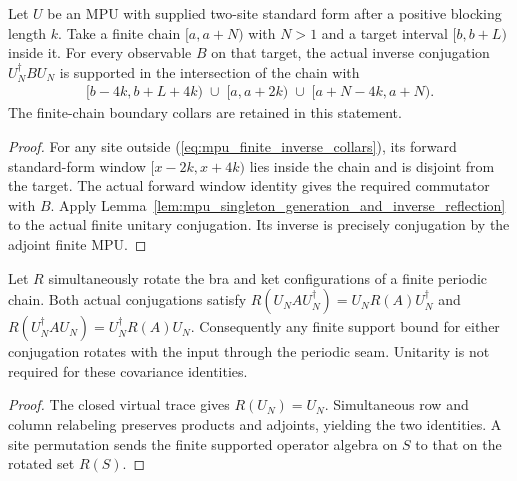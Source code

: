 \begin{lemma}
    \label{lem:mpu_finite_inverse_buffered_region}
    \leanok
    Let $U$ be an MPU with supplied two-site standard form after a
    positive blocking length $k$. Take a finite chain $[a,a+N)$ with
    $N>1$ and a target interval $[b,b+L)$ inside it. For every observable
    $B$ on that target, the actual inverse conjugation $U_N^\dagger B U_N$
    is supported in the intersection of the chain with
    \begin{align}
        \lbrack b-4k,b+L+4k)\;\cup\;\lbrack a,a+2k)\;\cup\;\lbrack a+N-4k,a+N).
        \label{eq:mpu_finite_inverse_collars}
    \end{align}
    The finite-chain boundary collars are retained in this statement.
\end{lemma}
\begin{proof}\leanok
    For any site outside (\ref{eq:mpu_finite_inverse_collars}), its
    forward standard-form window $[x-2k,x+4k)$ lies inside the chain
    and is disjoint from the target. The actual forward window identity
    gives the required commutator with $B$. Apply
    Lemma~\ref{lem:mpu_singleton_generation_and_inverse_reflection} to the actual
    finite unitary conjugation. Its inverse is precisely conjugation
    by the adjoint finite MPU.
\end{proof}

\begin{lemma}
    \label{lem:mpu_finite_conjugation_cyclic_relocation}
    \leanok
    Let $R$ simultaneously rotate the bra and ket configurations of a
    finite periodic chain. Both actual conjugations satisfy
    $R(U_N A U_N^\dagger)=U_N R(A)U_N^\dagger$ and
    $R(U_N^\dagger A U_N)=U_N^\dagger R(A)U_N$.
    Consequently any finite support bound for either conjugation
    rotates with the input through the periodic seam. Unitarity is
    not required for these covariance identities.
\end{lemma}
\begin{proof}\leanok
    The closed virtual trace gives $R(U_N)=U_N$. Simultaneous row and
    column relabeling preserves products and adjoints, yielding the
    two identities. A site permutation sends the finite supported
    operator algebra on $S$ to that on the rotated set $R(S)$.
\end{proof}


